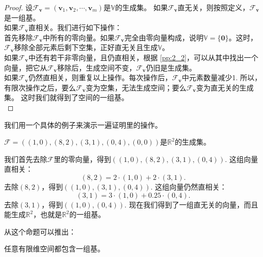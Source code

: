 \documentclass[12pt,UTF8]{ctexbook}
\begin{document}
\begin{proof} %
    设$\mathcal{F}_{\mathbf{v}} = (\mathbf{v}_1, \mathbf{v}_2, \cdots , \mathbf{v}_m )$是$\mathbb{V}$的生成集。
    如果$\mathcal{F}_{\mathbf{v}}$直无关，则按照定义，$\mathcal{F}_{\mathbf{v}}$是一组基。\\
    如果$\mathcal{F}_{\mathbf{v}}$直相关。我们进行如下操作：\\
    首先移除$\mathcal{F}_{\mathbf{v}}$中所有的零向量。如果$\mathcal{F}_{\mathbf{v}}$完全由零向量构成，说明$\mathbb{V} = \{\mathbf{0}\}$。这时，$\mathcal{F}_{\mathbf{v}}$移除全部元素后剩下空集，正好直无关且生成$\mathbb{V}$。\\
    如果$\mathcal{F}_{\mathbf{v}}$中还有若干非零向量，且仍直相关，根据 \ref{pp:2_2}，可以从其中找出一个向量，把它从$\mathcal{F}_{\mathbf{v}}$移除后，生成空间不变，$\mathcal{F}_{\mathbf{v}}$仍旧是生成集。\\
    如果$\mathcal{F}_{\mathbf{v}}$仍然直相关，则重复以上操作。每次操作后，$\mathcal{F}_{\mathbf{v}}$中元素数量减少1. 所以，有限次操作之后，要么$\mathcal{F}_{\mathbf{v}}$变为空集，无法生成空间；要么$\mathcal{F}_{\mathbf{v}}$变为直无关的生成集。
    这时我们就得到了空间的一组基。\\
\end{proof}


我们用一个具体的例子来演示一遍证明里的操作。

$\mathcal{F} = \left((1,0),(8,2),(3,1),(0,4),(0,0)\right)$是$\mathbb{R}^2$的生成集。

我们首先去除$\mathcal{F}$里的零向量，得到$\left((1,0),(8,2),(3,1),(0,4)\right).$ 这组向量直相关：
$$ (8,2) = 2\cdot(1,0) + 2\cdot(3,1).$$
去除$(8,2)$，得到$\left((1,0),(3,1),(0,4)\right).$ 这组向量仍然直相关：
$$ (3,1) = 3\cdot(1,0) + 0.25\cdot(0,4).$$
去除$(3,1)$，得到$\left((1,0),(0,4)\right).$ 现在我们得到了一组直无关的向量，而且能生成$\mathbb{R}^2$，也就是$\mathbb{R}^2$的一组基。

从这个命题可以推出：
\begin{cor}\label{cor:2_1}
    任意有限维空间都包含一组基。
\end{cor}
\end{document}
